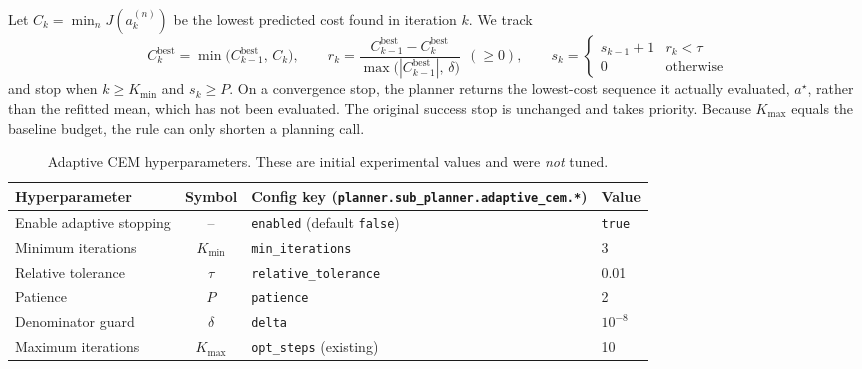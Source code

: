 \documentclass[10pt]{article}
\newcommand{\best}{\mathrm{best}}
\begin{document}
Let $C_k=\min_n J(a^{(n)}_k)$ be the lowest predicted cost found in iteration $k$. We track
\begin{equation}
C_k^{\best}=\min\!\big(C_{k-1}^{\best},\,C_k\big),
\qquad
r_k=\frac{C_{k-1}^{\best}-C_k^{\best}}{\max\!\big(|C_{k-1}^{\best}|,\,\delta\big)}\ \ (\ge 0),
\qquad
s_k=\begin{cases} s_{k-1}+1 & r_k<\tau\\ 0 & \text{otherwise}\end{cases}
\end{equation}
and stop when $k\ge K_{\min}$ and $s_k\ge P$. On a convergence stop, the planner returns the lowest-cost
sequence it actually evaluated, $a^\star$, rather than the refitted mean, which has not been evaluated. The original success
stop is unchanged and takes priority. Because $K_{\max}$ equals the baseline budget, the rule can only shorten
a planning call.

\begin{table}[H]
\centering\small
\begin{tabular}{lcll}
\toprule
Hyperparameter & Symbol & Config key (\texttt{planner.sub\_planner.adaptive\_cem.*}) & Value \\
\midrule
Enable adaptive stopping & -- & \texttt{enabled} (default \texttt{false}) & \texttt{true} \\
Minimum iterations & $K_{\min}$ & \texttt{min\_iterations} & 3 \\
Relative tolerance & $\tau$ & \texttt{relative\_tolerance} & 0.01 \\
Patience & $P$ & \texttt{patience} & 2 \\
Denominator guard & $\delta$ & \texttt{delta} & $10^{-8}$ \\
Maximum iterations & $K_{\max}$ & \texttt{opt\_steps} (existing) & 10 \\
\bottomrule
\end{tabular}
\caption{Adaptive CEM hyperparameters. These are initial experimental values and were \emph{not} tuned.}
\label{tab:hparams}
\end{table}
\end{document}
